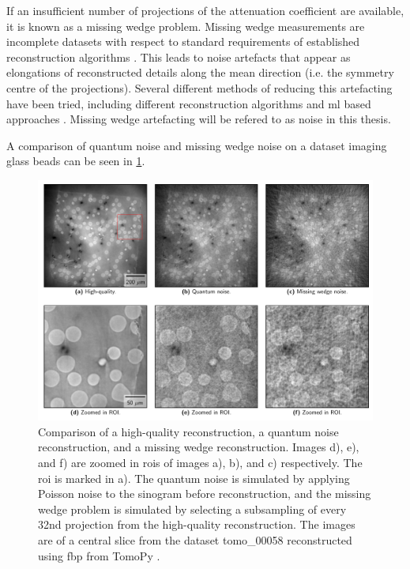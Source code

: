 If an insufficient number of projections of the attenuation coefficient are available, it is known as a missing wedge problem. Missing wedge measurements are incomplete datasets with respect to standard requirements of established reconstruction algorithms \cite{10.1111/jmi.12313}. This leads to noise artefacts that appear as elongations of reconstructed details along the mean direction (i.e. the symmetry centre of the projections). Several different methods of reducing this artefacting have been tried, including different reconstruction algorithms \cite{10.1111/jmi.12313} and \acrshort{ml} based approaches \cite{liu2020tomogan,GANrec}. Missing wedge artefacting will be refered to as noise in this thesis. 

A comparison of quantum noise and missing wedge noise on a dataset imaging glass beads can be seen in \cref{fig:noisecomparison}. 

\begin{figure}[htbp]  
    \centering
    \includegraphics[width=.9\textwidth]{figures/noisecomparison.pdf}
    \caption[Reconstruction noise comparison]{Comparison of a high-quality reconstruction, a quantum noise reconstruction, and a missing wedge reconstruction. Images d), e), and f) are zoomed in \acrshort{roi}s of images a), b), and c) respectively. The \acrshort{roi} is marked in a). The quantum noise is simulated by applying Poisson noise to the sinogram before reconstruction, and the missing wedge problem is simulated by selecting a subsampling of every 32nd projection from the high-quality reconstruction. The images are of a central slice from the dataset tomo\_00058 \cite{datasetglassspheres} reconstructed using \acrshort{fbp} from TomoPy \cite{TomoBank}. }
    \label{fig:noisecomparison}
\end{figure}

